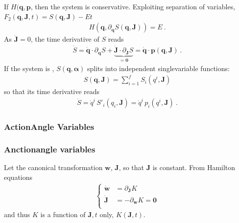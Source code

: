 \documentclass[letterpaper,10pt,english]{jupyterBook}
\begin{document}
\sphinxAtStartPar
If \(H(\mathbf{q}, \mathbf{p}\), then the system is conservative. Exploiting separation of variables, \(F_{2}(\mathbf{q}, \mathbf{J}, t) = S(\mathbf{q}, \mathbf{J}) - E t\)
\begin{equation*}
\begin{split}
H\left(\mathbf{q}, \partial_{\mathbf{q}} S(\mathbf{q}, \mathbf{J}) \right) = E \ .
\end{split}
\end{equation*}
\sphinxAtStartPar
As \(\dot{\mathbf{J}} = 0\), the time derivative of \(S\) reads
\begin{equation*}
\begin{split}\dot{S} = \dot{\mathbf{q}} \cdot \partial_{\mathbf{q}} S + \underbrace{\dot{\mathbf{J}} \cdot \partial_{\mathbf{J}} S}_{= \mathbf{0}} = \dot{\mathbf{q}} \cdot \mathbf{p}(\mathbf{q}, \mathbf{J}) \ .\end{split}
\end{equation*}
\sphinxAtStartPar
If the system is , \(S(\mathbf{q}, \boldsymbol{\alpha})\) splits into independent single\sphinxhyphen{}variable functions:
\begin{equation*}
\begin{split}
S(\mathbf{q}, \mathbf{J}) = \sum_{i=1}^f S_i(q^i, \mathbf{J})
\end{split}
\end{equation*}
\sphinxAtStartPar
so that its time derivative reads
\begin{equation*}
\begin{split}\dot{S} = \dot{q}^i \, S'_i(q_i, \mathbf{J}) = \dot{q}^i \, p_i(q^i, \mathbf{J}) \ .\end{split}
\end{equation*}

\subsubsection{Action\sphinxhyphen{}Angle Variables}
\label{\detokenize{ch/quantum-mechanics/atom-models/analytical-mechanics-short:action-angle-variables}}\subsubsection*{Anction\sphinxhyphen{}angle variables}

\sphinxAtStartPar
Let the canonical transformation \(\mathbf{w}\), \(\mathbf{J}\), so that \(\mathbf{J}\) is constant. From Hamilton equations
\begin{equation*}
\begin{split}\left\{
\begin{aligned}
  \dot{\mathbf{w}} & = \partial_{\mathbf{J}} K \\
  \dot{\mathbf{J}} & =-\partial_{\mathbf{w}} K = \mathbf{0} \\
\end{aligned}
\right.\end{split}
\end{equation*}
\sphinxAtStartPar
and thus \(K\) is a function of \(\mathbf{J}, t\) only, \(K(\mathbf{J},t)\).
\end{document}
